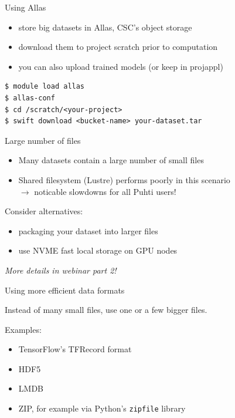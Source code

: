 \documentclass[aspectratio=1610,14pt]{beamer}
\newcommand{\vitem}{\vfill\item}
\begin{document}
\begin{frame}[fragile]{Using Allas}
  \begin{itemize}
  \item store big datasets in Allas, CSC's object storage
  \item download them to project scratch prior to computation
  \item you can also upload trained models (or keep in projappl)
  \end{itemize}

  \vfill
  
\begin{verbatim}
$ module load allas
$ allas-conf
$ cd /scratch/<your-project>
$ swift download <bucket-name> your-dataset.tar  
\end{verbatim}
\end{frame}

\begin{frame}{Large number of files}
  \begin{itemize}
  \vitem Many datasets contain a large number of small files
  \vitem Shared filesystem (Lustre) performs poorly in this scenario \\
    $\rightarrow$ noticable slowdowns for all Puhti users!
  \end{itemize}

  \vfill
  Consider alternatives:

  \begin{itemize}
    \vitem packaging your dataset into larger files                     
    \vitem use NVME fast local storage on GPU nodes
  \end{itemize}

  \vfill
  \emph{More details in webinar part 2!}

\end{frame}

\begin{frame}{Using more efficient data formats}

  Instead of many small files, use one or a few bigger files.

  \vfill
  
  Examples:

  \begin{itemize}
  \vitem TensorFlow's TFRecord format
  \vitem HDF5
  \vitem LMDB
  \vitem ZIP, for example via Python's {\tt zipfile} library
  \end{itemize}

  \vfill
\end{frame}
\end{document}
